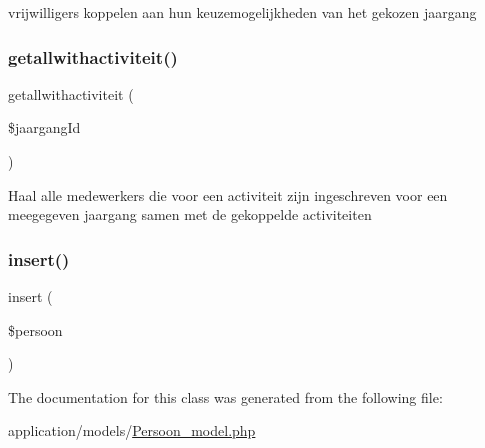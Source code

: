 vrijwilligers koppelen aan hun keuzemogelijkheden van het gekozen jaargang 

\mbox{\label{class_persoon__model_a9767acf5a4796aaacd967a4ac44e7a33}} 
\subsubsection{\texorpdfstring{getallwithactiviteit()}{getallwithactiviteit()}}
{\footnotesize\ttfamily getallwithactiviteit (\begin{DoxyParamCaption}\item[{}]{\$jaargang\+Id }\end{DoxyParamCaption})}

Haal alle medewerkers die voor een activiteit zijn ingeschreven voor een meegegeven jaargang samen met de gekoppelde activiteiten \mbox{\label{class_persoon__model_abb16337bee193e227f25cb9e37ac9394}} 
\subsubsection{\texorpdfstring{insert()}{insert()}}
{\footnotesize\ttfamily insert (\begin{DoxyParamCaption}\item[{}]{\$persoon }\end{DoxyParamCaption})}



The documentation for this class was generated from the following file\+:\begin{DoxyCompactItemize}
\item 
application/models/\mbox{\hyperlink{_persoon__model_8php}{Persoon\+\_\+model.\+php}}\end{DoxyCompactItemize}
